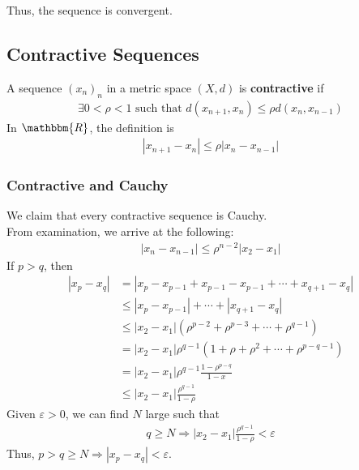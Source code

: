 \documentclass[10pt]{extarticle}
\newcommand{\R}{\mathbbm{R}}
\begin{document}
    Thus, the sequence is convergent.
  \subsection{Contractive Sequences}%
    A sequence $(x_n)_n$ in a metric space $(X,d)$ is \textbf{contractive} if
    \begin{align*}
      \exists 0 < \rho < 1 \text{ such that } d(x_{n+1},x_n) \leq \rho d(x_{n},x_{n-1}) \tag*{$\forall n\geq 1$}
    \end{align*}
    In $\R$, the definition is
    \begin{align*}
      |x_{n+1}-x_n| \leq \rho |x_n - x_{n-1}|
    \end{align*}
    \subsubsection{Contractive and Cauchy}%
    We claim that every contractive sequence is Cauchy.\\

    From examination, we arrive at the following:
    \begin{align*}
      |x_{n} - x_{n-1}| \leq \rho^{n-2}|x_{2}-x_{1}| \tag*{($\ast$)}
    \end{align*}
    If $p > q$, then
    \begin{align*}
      |x_{p}-x_{q}| &= |x_{p}-x_{p-1} + x_{p-1}-x_{p-1} + \cdots + x_{q+1}-x_q|\\
                    &\leq |x_p-x_{p-1}| + \cdots + |x_{q+1}-x_q|\tag*{Triangle Inequality}\\
                    &\leq |x_2-x_1| \left(\rho^{p-2} + \rho^{p-3} + \cdots + \rho^{q-1}\right)\\
                    &= |x_2-x_1| \rho^{q-1} \left(1 + \rho + \rho^2 + \cdots + \rho^{p-q-1}\right)\\
                    &= |x_2-x_1|\rho^{q-1}\frac{1-\rho^{p-q}}{1-x}\tag*{Finite Geometric Sequence}\\
                    &\leq |x_2 - x_1| \frac{\rho^{q-1}}{1-\rho}
    \end{align*}
    Given $\varepsilon > 0$, we can find $N$ large such that 
    \begin{align*}
      q\geq N \Rightarrow |x_2-x_1| \frac{\rho^{q-1}}{1-\rho} < \varepsilon
    \end{align*}
    Thus, $p > q \geq N \Rightarrow |x_p-x_q| < \varepsilon$.
\end{document}
